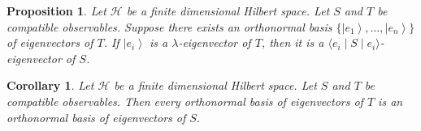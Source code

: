 \documentclass{book}
\newtheorem{prop}{Proposition}[chapter]
\newtheorem{cor}{Corollary}[prop]
\theoremstyle{definition}
\newcommand{\ket}[1]{\ensuremath{\left| {#1} \right\rangle}}
\begin{document}
\begin{prop}
Let $\mathcal{H}$ be a finite dimensional Hilbert space. Let $S$ and $T$ be compatible observables.
Suppose there exists an orthonormal basis $\{ \ket{e_1}, \ldots, \ket{e_n} \}$ of eigenvectors of $T$. If $\ket{e_i}$ is a $\lambda$-eigenvector of $T$, then it is a $\langle e_i \mid S \mid e_i \rangle$-eigenvector of $S$.
\end{prop}


\begin{cor}
Let $\mathcal{H}$ be a finite dimensional Hilbert space. Let $S$ and $T$ be compatible observables. Then every orthonormal basis of eigenvectors of $T$ is an orthonormal basis of eigenvectors of $S$.
\end{cor}
\end{document}
